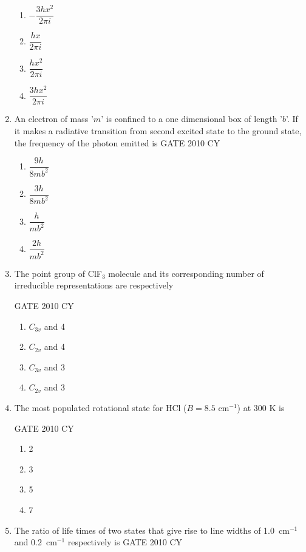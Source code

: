 \documentclass[journal,12pt,onecolumn]{IEEEtran}
\theoremstyle{remark}
\begin{document}
\begin{enumerate}
\begin{multicols}{2}
\begin{enumerate}
    \item $-\dfrac{3 h x^{2}}{2\pi i}$
    \item $\dfrac{h x}{2\pi i}$
    \item $\dfrac{h x^2}{2\pi i}$
    \item $\dfrac{3 h x^2}{2\pi i}$
\end{enumerate}
\end{multicols}

\item An electron of mass '$m$' is confined to a one dimensional box of length '$b$'. If it makes a radiative transition from second excited state to the ground state, the frequency of the photon emitted is
\hfill{GATE 2010 CY}

\begin{multicols}{2}
\begin{enumerate}
    \item $\dfrac{9h}{8mb^2}$
    \item $\dfrac{3h}{8mb^2}$
    \item $\dfrac{h}{mb^2}$
    \item $\dfrac{2h}{mb^2}$
\end{enumerate}
\end{multicols}

\item The point group of ClF$_3$ molecule and its corresponding number of irreducible representations are respectively

\hfill{GATE 2010 CY}

\begin{multicols}{2}
\begin{enumerate}
    \item $C_{3v}$ and 4
    \item $C_{2v}$ and 4
    \item $C_{3v}$ and 3
    \item $C_{2v}$ and 3
\end{enumerate}
\end{multicols}

\item The most populated rotational state for HCl ($B = 8.5$ cm$^{-1}$) at 300 K is

\hfill{GATE 2010 CY}
\begin{multicols}{2}
\begin{enumerate}
    \item 2
    \item 3
    \item 5
    \item 7
\end{enumerate}
\end{multicols}
\item The ratio of life times of two states that give rise to line widths of 1.0~cm$^{-1}$ and 0.2~cm$^{-1}$ respectively is
\hfill{GATE 2010 CY}


\end{enumerate}
\end{document}
